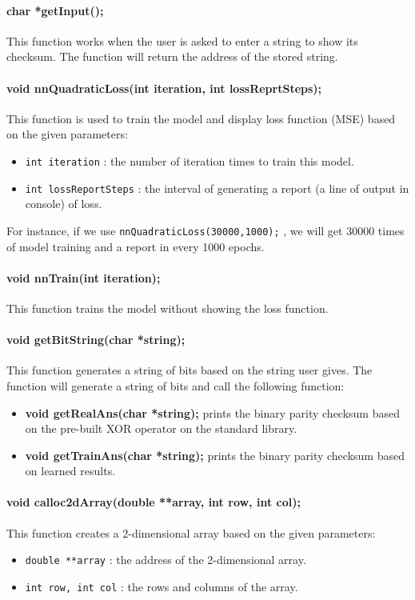 	\paragraph{char *getInput();\\}
	This function works when the user is asked to enter a string to show its checksum. The function will return the address of the stored string.
	\paragraph{void nnQuadraticLoss(int iteration, int lossReprtSteps);\\}
	This function is used to train the model and display loss function (MSE) based on the given parameters:
	\begin{itemize}
	    \item \lstinline{int iteration} : the number of iteration times to train this model.
	    \item \lstinline{int lossReportSteps} : the interval of generating a report (a line of output in console) of loss. 
	\end{itemize}
	For instance, if we use  \lstinline{nnQuadraticLoss(30000,1000);} , we will get  30000 times of model training and a report in every 1000 epochs.
	\paragraph{void nnTrain(int iteration);\\}
	This function trains the model without showing the loss function. 
	\paragraph{void getBitString(char *string);\\}
	This function generates a string of bits based on the  string user gives. The function will generate a string of bits and call the following function:
	\begin{itemize}
	    \item \textbf{void getRealAns(char *string);} prints the binary parity checksum based on the pre-built XOR operator on the standard library. 
	    \item \textbf{void getTrainAns(char *string);} prints the binary parity checksum based on learned results.  
	\end{itemize}
	
	
	
	\paragraph{void calloc2dArray(double **array, int row, int col);\\}
	This function creates a 2-dimensional array based on the given parameters:
	\begin{itemize}
	    \item \lstinline{double **array} : the address of the 2-dimensional array.
	    \item \lstinline{int row, int col} : the rows and columns of the array. 
	\end{itemize}
